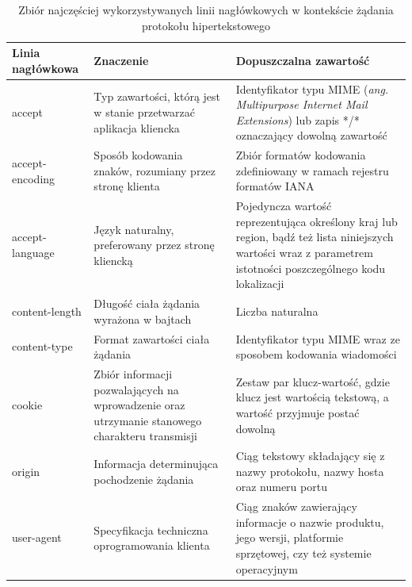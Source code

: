 \begin{longtable}{|l|p{6cm}|p{5cm}|}
    \caption{Zbiór najczęściej wykorzystywanych linii nagłówkowych w kontekście żądania protokołu hipertekstowego}
    \label{tab:naglowki-zadanie} \\
    \hline
    Linia nagłówkowa & Znaczenie & Dopuszczalna zawartość \\ \hline\hline
    \endhead
    accept & Typ zawartości, którą jest w stanie przetwarzać aplikacja kliencka & Identyfikator typu MIME (\textit{ang. Multipurpose Internet Mail Extensions}) lub zapis */* oznaczający dowolną zawartość  \\ \hline
accept-encoding & Sposób kodowania znaków, rozumiany przez stronę klienta & Zbiór formatów kodowania zdefiniowany w ramach rejestru formatów IANA\\ \hline
accept-language & Język naturalny, preferowany przez stronę kliencką & Pojedyncza wartość reprezentująca określony kraj lub region, bądź też lista niniejszych wartości wraz z parametrem istotności poszczególnego kodu lokalizacji\\ \hline
content-length & Długość ciała żądania wyrażona w bajtach & Liczba naturalna\\ \hline
content-type & Format zawartości ciała żądania & Identyfikator typu MIME wraz ze sposobem kodowania wiadomości\\ \hline
cookie & Zbiór informacji pozwalających na wprowadzenie oraz utrzymanie stanowego charakteru transmisji & Zestaw par klucz-wartość, gdzie klucz jest wartością tekstową, a wartość przyjmuje postać dowolną\\ \hline
origin & Informacja determinująca pochodzenie żądania & Ciąg tekstowy składający się z nazwy protokołu, nazwy hosta oraz numeru portu\\ \hline
user-agent & Specyfikacja techniczna oprogramowania klienta & Ciąg znaków zawierający informacje o nazwie produktu, jego wersji, platformie sprzętowej, czy też systemie operacyjnym \\ \hline
\end{longtable}

